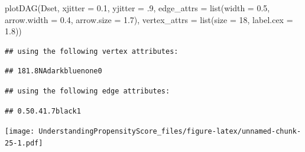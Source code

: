 \documentclass[
]{book}
\newenvironment{Shaded}{\begin{snugshade}}{\end{snugshade}}
\newcommand{\AttributeTok}[1]{\textcolor[rgb]{0.77,0.63,0.00}{#1}}
\newcommand{\DecValTok}[1]{\textcolor[rgb]{0.00,0.00,0.81}{#1}}
\newcommand{\FloatTok}[1]{\textcolor[rgb]{0.00,0.00,0.81}{#1}}
\newcommand{\FunctionTok}[1]{\textcolor[rgb]{0.00,0.00,0.00}{#1}}
\newcommand{\NormalTok}[1]{#1}
\begin{document}
\begin{Shaded}
\begin{Highlighting}[]
\FunctionTok{plotDAG}\NormalTok{(Dset, }\AttributeTok{xjitter =} \FloatTok{0.1}\NormalTok{, }\AttributeTok{yjitter =}\NormalTok{ .}\DecValTok{9}\NormalTok{,}
        \AttributeTok{edge\_attrs =} \FunctionTok{list}\NormalTok{(}\AttributeTok{width =} \FloatTok{0.5}\NormalTok{, }\AttributeTok{arrow.width =} \FloatTok{0.4}\NormalTok{, }\AttributeTok{arrow.size =} \FloatTok{1.7}\NormalTok{),}
        \AttributeTok{vertex\_attrs =} \FunctionTok{list}\NormalTok{(}\AttributeTok{size =} \DecValTok{18}\NormalTok{, }\AttributeTok{label.cex =} \FloatTok{1.8}\NormalTok{))}
\end{Highlighting}
\end{Shaded}

\begin{verbatim}
## using the following vertex attributes:
\end{verbatim}

\begin{verbatim}
## 181.8NAdarkbluenone0
\end{verbatim}

\begin{verbatim}
## using the following edge attributes:
\end{verbatim}

\begin{verbatim}
## 0.50.41.7black1
\end{verbatim}

\texttt{[image: UnderstandingPropensityScore\_files/figure-latex/unnamed-chunk-25-1.pdf]}
\end{document}
